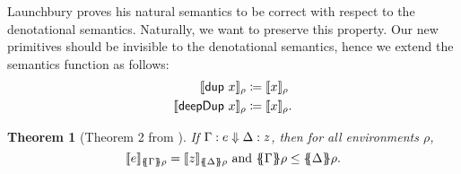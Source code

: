 \documentclass[preprint]{sigplanconf}
\newtheorem{theorem}{Theorem}
\theoremstyle{nonumberplain}
\begin{document}
Launchbury proves his natural semantics to be correct with respect to the denotational semantics. 
Naturally, we want to preserve this property. Our new primitives should be invisible to the denotational semantics, hence we extend the semantics function as follows:
\begin{align*}
\llbracket \text{\textsf{dup}}\ x \rrbracket_{\rho} &\coloneqq \llbracket x \rrbracket_{\rho} \\
\llbracket \text{\textsf{deepDup}}\ x \rrbracket_{\rho} &\coloneqq \llbracket x \rrbracket_{\rho}.
\end{align*}

\begin{theorem}[Theorem 2 from \citep{launchbury}]
If $\Gamma : e \Downarrow \Delta : z$, then for all environments $\rho$,
\[
\dsem e {\esem \Gamma \rho} = \dsem z {\esem \Delta \rho}
\text{ and }
\esem \Gamma \rho \le \esem \Delta \rho.
\]
\end{theorem}
\end{document}
